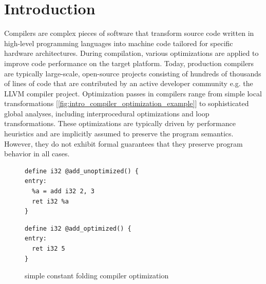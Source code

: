 

\chapter{Introduction}

Compilers are complex pieces of software that transform source code written in high-level programming languages into machine code tailored for specific hardware architectures. During compilation, various optimizations are applied to improve code performance on the target platform. Today, production compilers are typically large-scale, open-source projects consisting of hundreds of thousands of lines of code that are contributed by an active developer community e.g. the LLVM compiler project. Optimization passes in compilers range from simple local transformations [\ref{fig:intro_compiler_optimization_example}] to sophisticated global analyses, including interprocedural optimizations and loop transformations. These optimizations are typically driven by performance heuristics and are implicitly assumed to preserve the program semantics. However, they do not exhibit formal guarantees that they preserve program behavior in all cases. 

\begin{figure}[ht]
\centering
\begin{minipage}{0.45\textwidth}
\label{fig:intro_compiler_optimization_example}
\begin{lstlisting}
define i32 @add_unoptimized() {
entry:
  %a = add i32 2, 3
  ret i32 %a
}
\end{lstlisting}
\end{minipage}
\hspace{0.05\textwidth}
\begin{minipage}{0.45\textwidth}
\begin{lstlisting}
define i32 @add_optimized() {
entry:
  ret i32 5
}
\end{lstlisting}
\end{minipage}
\caption{simple constant folding compiler optimization}
\label{fig:llvm-constant-folding}
\end{figure}

